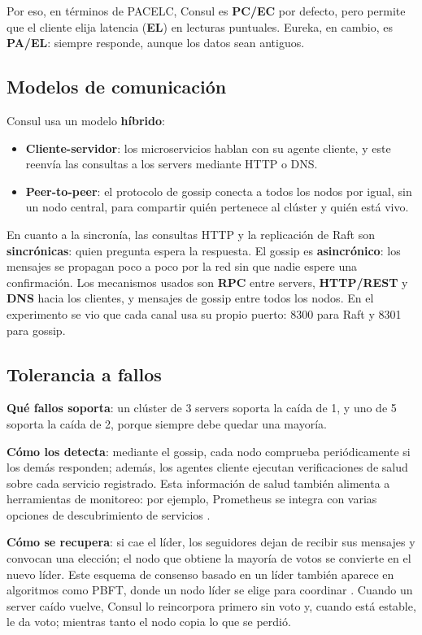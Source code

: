 \documentclass[12pt,a4paper]{article}
\begin{document}
Por eso, en términos de PACELC, Consul es \textbf{PC/EC} por defecto, pero permite que el cliente elija latencia (\textbf{EL}) en lecturas puntuales. Eureka, en cambio, es \textbf{PA/EL}: siempre responde, aunque los datos sean antiguos.

\subsection{Modelos de comunicación}
Consul usa un modelo \textbf{híbrido}:
\begin{itemize}
  \item \textbf{Cliente-servidor}: los microservicios hablan con su agente cliente, y este reenvía las consultas a los servers mediante HTTP o DNS.
  \item \textbf{Peer-to-peer}: el protocolo de gossip conecta a todos los nodos por igual, sin un nodo central, para compartir quién pertenece al clúster y quién está vivo.
\end{itemize}

En cuanto a la sincronía, las consultas HTTP y la replicación de Raft son \textbf{sincrónicas}: quien pregunta espera la respuesta. El gossip es \textbf{asincrónico}: los mensajes se propagan poco a poco por la red sin que nadie espere una confirmación. Los mecanismos usados son \textbf{RPC} entre servers, \textbf{HTTP/REST} y \textbf{DNS} hacia los clientes, y mensajes de gossip entre todos los nodos. En el experimento se vio que cada canal usa su propio puerto: 8300 para Raft y 8301 para gossip.

\subsection{Tolerancia a fallos}
\textbf{Qué fallos soporta}: un clúster de 3 servers soporta la caída de 1, y uno de 5 soporta la caída de 2, porque siempre debe quedar una mayoría.

\textbf{Cómo los detecta}: mediante el gossip, cada nodo comprueba periódicamente si los demás responden; además, los agentes cliente ejecutan verificaciones de salud sobre cada servicio registrado. Esta información de salud también alimenta a herramientas de monitoreo: por ejemplo, Prometheus se integra con varias opciones de descubrimiento de servicios \cite[p.~72019]{faseeha2025observability}.

\textbf{Cómo se recupera}: si cae el líder, los seguidores dejan de recibir sus mensajes y convocan una elección; el nodo que obtiene la mayoría de votos se convierte en el nuevo líder. Este esquema de consenso basado en un líder también aparece en algoritmos como PBFT, donde un nodo líder se elige para coordinar \cite{islam2023consensus}. Cuando un server caído vuelve, Consul lo reincorpora primero sin voto y, cuando está estable, le da voto; mientras tanto el nodo copia lo que se perdió.
\end{document}
